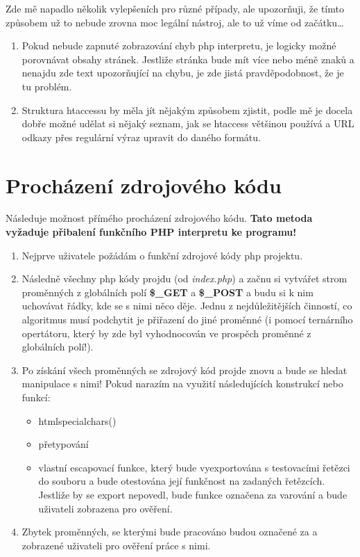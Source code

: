 \documentclass[12pt, a4paper]{report}
\begin{document}
Zde mě napadlo několik vylepšeních pro různé případy, ale upozorňuji, že tímto způsobem už to nebude zrovna moc legální nástroj, ale to už víme od začátku\ldots
\begin{enumerate}
\item Pokud nebude zapnuté zobrazování chyb php interpretu, je logicky možné porovnávat obsahy stránek. Jestliže stránka bude mít více nebo méně znaků a nenajdu zde text upozorňující na chybu, je zde jistá pravděpodobnost, že je tu problém.
\item Struktura htaccessu by měla jít nějakým způsobem zjistit, podle mě je docela dobře možné udělat si nějaký seznam, jak se htaccess většinou používá a URL odkazy přes regulární výraz upravit do daného formátu.
\end{enumerate}
\section{Procházení zdrojového kódu}
Následuje možnost přímého procházení zdrojového kódu. \textbf{Tato metoda vyžaduje přibalení funkčního PHP interpretu ke programu!}
\begin{enumerate}
\item Nejprve uživatele požádám o funkční zdrojové kódy php projektu.
\item Následně všechny php kódy projdu (od \emph{index.php}) a začnu si vytvářet strom proměnných z globálních polí \textbf{\$\_GET} a \textbf{\$\_POST}  a budu si k nim uchovávat řádky, kde se s nimi něco děje. Jednu z nejdůležitějších činností, co algoritmus musí podchytit je přiřazení do jiné proměnné (i pomocí ternárního opertátoru, který by zde byl vyhodnocován ve prospěch proměnné z globálních polí!).
\item Po získání všech proměnných se zdrojový kód projde znovu a bude se hledat manipulace s nimi! Pokud narazím na využití následujících konstrukcí nebo funkcí:
\begin{itemize}
\item htmlspecialchars()
\item přetypování
\item vlastní escapovací funkce, který bude vyexportována s testovacími řetězci do souboru a bude otestována její funkčnost na zadaných řetězcích. Jestliže by se export nepovedl, bude funkce označena za varování a bude uživateli zobrazena pro ověření.
\end{itemize}
\item Zbytek proměnných, se kterými bude pracováno budou označené za  a zobrazené uživateli pro ověření práce s nimi.
\end{enumerate}


\end{document}

